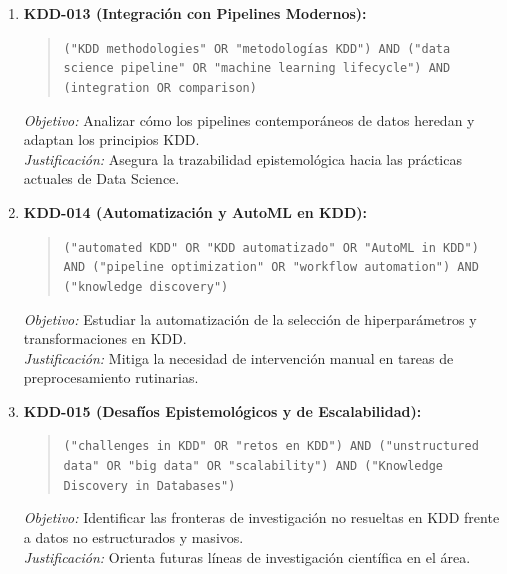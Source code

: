 \begin{enumerate}
  \item \textbf{KDD-013 (Integración con Pipelines Modernos):}
  \begin{quote}
  \texttt{("KDD methodologies" OR "metodologías KDD") AND ("data science pipeline" OR "machine learning lifecycle") AND (integration OR comparison)}
  \end{quote}
  \textit{Objetivo:} Analizar cómo los pipelines contemporáneos de datos heredan y adaptan los principios KDD.\\
  \textit{Justificación:} Asegura la trazabilidad epistemológica hacia las prácticas actuales de Data Science.
  \item \textbf{KDD-014 (Automatización y AutoML en KDD):}
  \begin{quote}
  \texttt{("automated KDD" OR "KDD automatizado" OR "AutoML in KDD") AND ("pipeline optimization" OR "workflow automation") AND ("knowledge discovery")}
  \end{quote}
  \textit{Objetivo:} Estudiar la automatización de la selección de hiperparámetros y transformaciones en KDD.\\
  \textit{Justificación:} Mitiga la necesidad de intervención manual en tareas de preprocesamiento rutinarias.
  \item \textbf{KDD-015 (Desafíos Epistemológicos y de Escalabilidad):}
  \begin{quote}
  \texttt{("challenges in KDD" OR "retos en KDD") AND ("unstructured data" OR "big data" OR "scalability") AND ("Knowledge Discovery in Databases")}
  \end{quote}
  \textit{Objetivo:} Identificar las fronteras de investigación no resueltas en KDD frente a datos no estructurados y masivos.\\
  \textit{Justificación:} Orienta futuras líneas de investigación científica en el área.
\end{enumerate}


